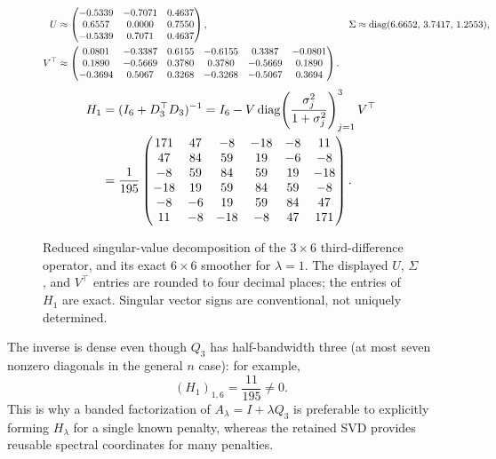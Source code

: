 \begin{figure}[t]
\centering
\begingroup
\small
\setlength{\arraycolsep}{3pt}
\begin{equation}\label{eq:d3-numerical-svd}
\begin{aligned}
U&\approx
\begin{pmatrix}
-0.5339&-0.7071&0.4637\\
 0.6557& 0.0000&0.7550\\
-0.5339& 0.7071&0.4637
\end{pmatrix},
&
\Sigma&\approx\operatorname{diag}(6.6652,\,3.7417,\,1.2553),\\
V^\top&\approx
\begin{pmatrix}
 0.0801&-0.3387& 0.6155&-0.6155& 0.3387&-0.0801\\
 0.1890&-0.5669& 0.3780& 0.3780&-0.5669& 0.1890\\
-0.3694& 0.5067& 0.3268&-0.3268&-0.5067& 0.3694
\end{pmatrix}.
\end{aligned}
\end{equation}
\begin{equation}\label{eq:d3-numerical-h}
\begin{aligned}
H_1
&=(I_6+D_3^\top D_3)^{-1}
=I_6-V\operatorname{diag}\!\left(\frac{\sigma_j^2}{1+\sigma_j^2}\right)_{j=1}^{3}V^\top\\
&=\frac1{195}
\begin{pmatrix}
171&47&-8&-18&-8&11\\
47&84&59&19&-6&-8\\
-8&59&84&59&19&-18\\
-18&19&59&84&59&-8\\
-8&-6&19&59&84&47\\
11&-8&-18&-8&47&171
\end{pmatrix}.
\end{aligned}
\end{equation}
\endgroup
\caption{Reduced singular-value decomposition of the
$3\times6$ third-difference operator, and its exact
$6\times6$ smoother for $\lambda=1$. The displayed $U$,
$\Sigma$, and $V^\top$ entries are rounded to four
decimal places; the entries of $H_1$ are exact. Singular
vector signs are conventional, not uniquely determined.}
\label{fig:d3-matrices}
\end{figure}

The inverse is dense even though $Q_3$ has
half-bandwidth three (at most seven nonzero diagonals
in the general $n$ case): for example,
\begin{equation}\label{eq:third-order-distant-leverage}
(H_1)_{1,6}=\frac{11}{195}\neq0.
\end{equation}
This is why a banded factorization of
$A_\lambda=I+\lambda Q_3$ is preferable to
explicitly forming $H_\lambda$ for a single known
penalty, whereas the retained SVD provides reusable
spectral coordinates for many penalties.

